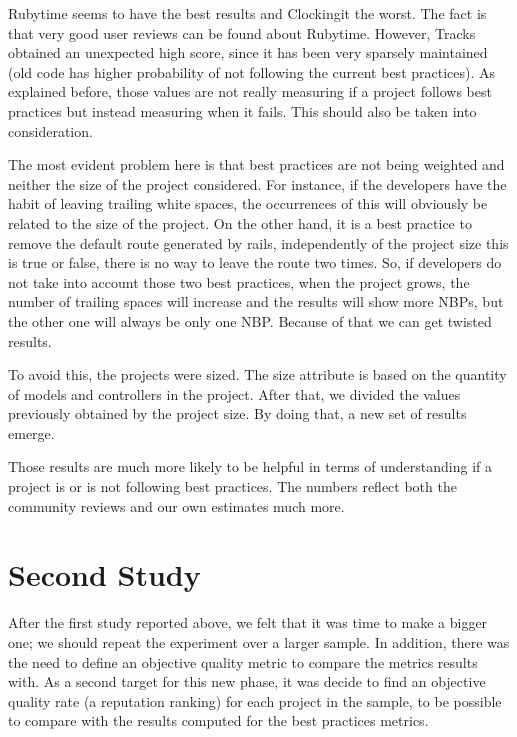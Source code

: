 

Rubytime seems to have the best results and Clockingit the worst. 
The fact is that very good user reviews can be found about Rubytime.
However, Tracks obtained an unexpected high score, since it has been very sparsely maintained 
(old code has higher probability of not following the current best practices).
As explained before, those values are not really measuring if a project follows best practices 
but instead measuring when it fails.
This should also be taken into consideration. 

The most evident problem here is that best practices are not being weighted and neither the size of the project considered.
For instance, if the developers have the habit of leaving trailing white spaces, 
the occurrences of this will obviously be related to the size of the project.
On the other hand, it is a best practice to remove the default route generated by rails, 
independently of the project size this is true or false, there is no way to leave the route two times. 
So, if developers do not take into account those two best practices, when the project grows, 
the number of trailing spaces will increase and the results will show more NBPs, 
but the other one will always be only one NBP.  
Because of that we can get twisted results.

To avoid this, the projects were sized.
The size attribute is based on the quantity of models and controllers in the project.
After that, we divided the values previously obtained  by the project size.
By doing that, a new set of results emerge.



Those results are much more likely to be helpful in terms of understanding if a project is or is not following 
best practices.
The numbers reflect both the community reviews and our own estimates much more.


\section{Second Study}\label{subsec:second_study}
After the first study reported above, we felt that it was time to make a bigger one;
we should repeat the experiment over a larger sample. 
In addition, there was the need to define an objective quality metric to compare the metrics results with.
As a second target for this new phase, it was decide to find an objective quality rate (a reputation ranking) for each project in the sample, 
to be possible to compare with the results computed for the best practices metrics.

